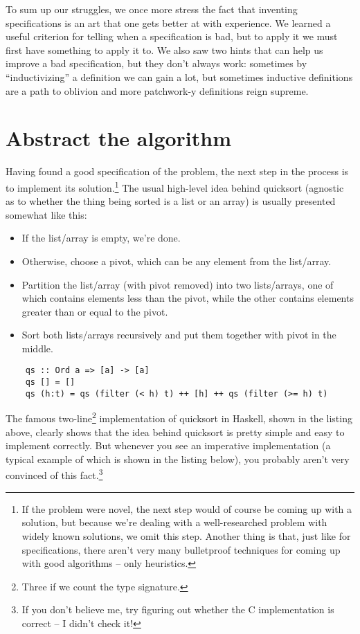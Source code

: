 \documentclass[declaration,mgr,english,shortabstract]{iithesis}
\begin{document}
To sum up our struggles, we once more stress the fact that inventing specifications is an art that one gets better at with experience. We learned a useful criterion for telling when a specification is bad, but to apply it we must first have something to apply it to. We also saw two hints that can help us improve a bad specification, but they don't always work: sometimes by ``inductivizing'' a definition we can gain a lot, but sometimes inductive definitions are a path to oblivion and more patchwork-y definitions reign supreme.

\section{Abstract the algorithm} \label{template}

Having found a good specification of the problem, the next step in the process is to implement its solution.\footnote{If the problem were novel, the next step would of course be coming up with a solution, but because we're dealing with a well-researched problem with widely known solutions, we omit this step. Another thing is that, just like for specifications, there aren't very many bulletproof techniques for coming up with good algorithms -- only heuristics.} The usual high-level idea behind quicksort (agnostic as to whether the thing being sorted is a list or an array) is usually presented somewhat like this:

\begin{itemize}
    \item If the list/array is empty, we're done.
    \item Otherwise, choose a pivot, which can be any element from the list/array.
    \item Partition the list/array (with pivot removed) into two lists/arrays, one of which contains elements less than the pivot, while the other contains elements greater than or equal to the pivot.
    \item Sort both lists/arrays recursively and put them together with pivot in the middle.
\end{itemize}

\begin{verbatim}
    qs :: Ord a => [a] -> [a]
    qs [] = []
    qs (h:t) = qs (filter (< h) t) ++ [h] ++ qs (filter (>= h) t)
\end{verbatim}

The famous two-line\footnote{Three if we count the type signature.} implementation of quicksort in Haskell, shown in the listing above, clearly shows that the idea behind quicksort is pretty simple and easy to implement correctly. But whenever you see an imperative implementation (a typical example of which is shown in the listing below), you probably aren't very convinced of this fact.\footnote{If you don't believe me, try figuring out whether the C implementation is correct -- I didn't check it!}
\end{document}
